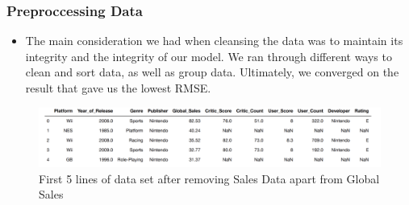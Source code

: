 


\begin{frame}
    \frametitle{Preproccessing Data}
    \begin{itemize}
    \item The main consideration we had when cleansing the data was to maintain its integrity and the integrity of our model. We ran through different ways to clean and sort data, as well as group data. Ultimately, we converged on the result that gave us the lowest RMSE. 
    \end{itemize}
    \begin{figure}[H]
        \centering
        \includegraphics[scale=.6]{graphs/headdata.png}
        \caption{First 5 lines of data set after removing Sales Data apart from Global Sales}
        \label{fig:N20}
    \end{figure}
\end{frame}
    
